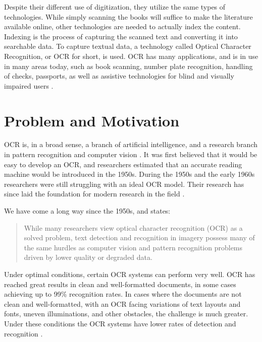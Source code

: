Despite their different use of digitization, they utilize the same types of technologies. While simply scanning the books will suffice to make the literature available online, other technologies are needed to actually index the content. Indexing is the process of capturing the scanned text and converting it into searchable data. To capture textual data, a technology called Optical Character Recognition, or OCR for short, is used. OCR has many applications, and is in use in many areas today, such as book scanning, number plate recognition, handling of checks, passports, as well as assistive technologies for blind and visually impaired users \citep{mori1999optical, kurzweil2000reading}.


\section{Problem and Motivation}
\label{sec:problem_motivation}
OCR is, in a broad sense, a branch of artificial intelligence, and a research branch in pattern recognition and computer vision \citep{mori1999optical}. It was first believed that it would be easy to develop an OCR, and researchers estimated that an accurate reading machine would be introduced in the 1950s. During the 1950s and the early 1960s researchers were still struggling with an ideal OCR model. Their research has since laid the foundation for modern research in the field \citep{mori1992historical}.

We have come a long way since the 1950s, and \citep{ye2015text} states:

\begin{quote}
    While many researchers view optical character recognition (OCR) as a solved problem, text detection and recognition in imagery possess many of the same hurdles as computer vision and pattern recognition problems driven by lower quality or degraded data.
\end{quote}

Under optimal conditions, certain OCR systems can perform very well. OCR has reached great results in clean and well-formatted documents, in some cases achieving up to 99\% recognition rates. In cases where the documents are not clean and well-formatted, with an OCR facing variations of text layouts and fonts, uneven illuminations, and other obstacles, the challenge is much greater. Under these conditions the OCR systems have lower rates of detection and recognition \citep{ye2015text}.

